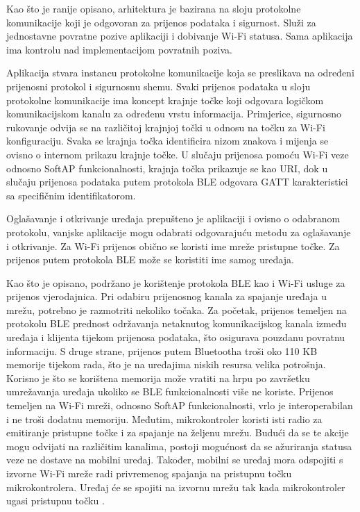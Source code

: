 Kao što je ranije opisano, arhitektura je bazirana na sloju protokolne komunikacije koji je odgovoran za prijenos podataka i sigurnost. Služi za jednostavne povratne pozive aplikaciji  i dobivanje Wi-Fi statusa. Sama aplikacija ima kontrolu nad implementacijom povratnih poziva. 

Aplikacija stvara instancu protokolne komunikacije koja se preslikava na određeni prijenosni protokol i sigurnosnu shemu. Svaki prijenos podataka u sloju protokolne komunikacije ima koncept krajnje točke  koji odgovara logičkom komunikacijskom kanalu za određenu vrstu informacija. Primjerice, sigurnosno rukovanje  odvija se na različitoj krajnjoj točki u odnosu na točku za Wi-Fi konfiguraciju. Svaka se krajnja točka identificira nizom znakova i mijenja se ovisno o internom prikazu krajnje točke. U slučaju prijenosa pomoću Wi-Fi veze odnosno SoftAP funkcionalnosti, krajnja točka prikazuje se kao URI, dok u slučaju prijenosa podataka putem protokola BLE odgovara GATT karakteristici sa specifičnim identifikatorom. 

Oglašavanje i otkrivanje uređaja prepušteno je aplikaciji i ovisno o odabranom protokolu, vanjske aplikacije mogu odabrati odgovarajuću metodu za oglašavanje i otkrivanje. Za Wi-Fi prijenos obično se koristi ime mreže pristupne točke. Za prijenos putem protokola BLE može se koristiti ime samog uređaja. 

Kao što je opisano, podržano je korištenje protokola BLE kao i Wi-Fi usluge za prijenos vjerodajnica. Pri odabiru prijenosnog kanala za spajanje uređaja u mrežu, potrebno je razmotriti nekoliko točaka. Za početak, prijenos temeljen na protokolu BLE prednost održavanja netaknutog komunikacijskog kanala između uređaja i klijenta tijekom prijenosa podataka, što osigurava pouzdanu povratnu informaciju. S druge strane, prijenos putem Bluetootha troši oko 110 KB memorije tijekom rada, što je na uređajima niskih resursa velika potrošnja. Korisno je što se korištena memorija može vratiti na hrpu  po završetku umrežavanja uređaja ukoliko se BLE funkcionalnosti više ne koriste. Prijenos temeljen na Wi-Fi mreži, odnosno SoftAP funkcionalnosti, vrlo je interoperabilan i ne troši dodatnu memoriju. Međutim, mikrokontroler koristi isti radio za emitiranje pristupne točke i za spajanje na željenu mrežu. Budući da se te akcije mogu odvijati na različitim kanalima, postoji mogućnost da se ažuriranja statusa veze ne dostave na mobilni uređaj. Također, mobilni se uređaj mora odspojiti s izvorne Wi-Fi mreže radi privremenog spajanja na pristupnu točku mikrokontrolera. Uređaj će se spojiti na izvornu mrežu tak kada mikrokontroler ugasi pristupnu točku \cite{unified_provisioning}. 

